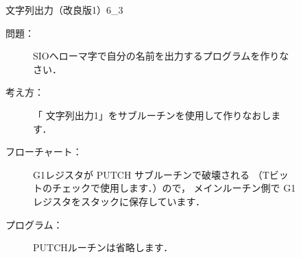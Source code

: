 \begin{figure}[btp]
\begin{reidai}{文字列出力（改良版1）}{6_3}
\begin{description}
\item[問題：] SIOへローマ字で自分の名前を出力するプログラムを作りなさい．

\item[考え方：]
「 文字列出力1」をサブルーチンを使用して作りなおします．

\item[フローチャート：]
G1レジスタが PUTCH サブルーチンで破壊される
（Tビットのチェックで使用します．）ので，
メインルーチン側で G1 レジスタをスタックに保存しています．

\begin{center}
\end{center}

\item[プログラム：]PUTCHルーチンは省略します．


\end{description}
\end{reidai}
\end{figure}
